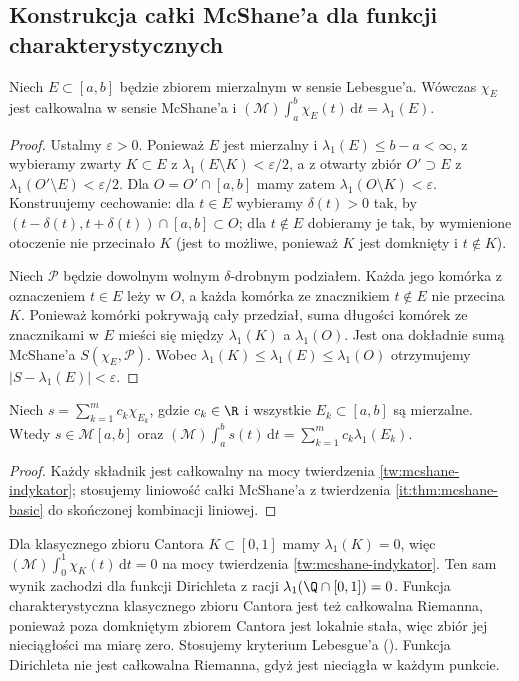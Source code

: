 \subsection*{Konstrukcja całki McShane'a dla funkcji charakterystycznych}
\begin{twierdzenie}\label{tw:mcshane-indykator}
Niech $E\subset[a,b]$ będzie zbiorem mierzalnym w sensie Lebesgue'a. Wówczas $\chi_E$ jest całkowalna w sensie McShane'a i
$(\mathcal M)\int_a^b\chi_E(t)\,\mathrm dt=\lambda_1(E)$.
\end{twierdzenie}
\begin{proof}
Ustalmy $\varepsilon>0$. Ponieważ $E$ jest mierzalny i $\lambda_1(E)\le b-a<\infty$, z
wybieramy zwarty $K\subset E$ z $\lambda_1(E\setminus K)<\varepsilon/2$,
a z 
otwarty zbiór $O'\supset E$ z $\lambda_1(O'\setminus E)<\varepsilon/2$.
Dla $O=O'\cap[a,b]$ mamy zatem $\lambda_1(O\setminus K)<\varepsilon$. Konstruujemy cechowanie: dla $t\in E$ wybieramy $\delta(t)>0$ tak, by $(t-\delta(t),t+\delta(t))\cap[a,b]\subset O$; dla $t\notin E$ dobieramy je tak, by wymienione otoczenie nie przecinało $K$ (jest to możliwe, ponieważ $K$ jest domknięty i $t\notin K$).

Niech $\mathcal P$ będzie dowolnym wolnym $\delta$-drobnym podziałem. Każda jego komórka z oznaczeniem $t\in E$ leży w $O$, a każda komórka ze znacznikiem $t\notin E$ nie przecina $K$. Ponieważ komórki pokrywają cały przedział, suma długości komórek ze znacznikami w $E$ mieści się między $\lambda_1(K)$ a $\lambda_1(O)$. Jest ona dokładnie sumą McShane'a $S(\chi_E,\mathcal P)$. Wobec $\lambda_1(K)\le\lambda_1(E)\le\lambda_1(O)$ otrzymujemy $|S-\lambda_1(E)|<\varepsilon$.
\end{proof}
\begin{wniosek}\label{wn:mcshane-proste}
Niech $s=\sum_{k=1}^m c_k\chi_{E_k}$, gdzie $c_k\in\R$ i wszystkie $E_k\subset[a,b]$ są mierzalne. Wtedy $s\in\mathcal M[a,b]$ oraz $(\mathcal M)\int_a^b s(t)\,\mathrm dt=\sum_{k=1}^m c_k\lambda_1(E_k)$.
\end{wniosek}
\begin{proof}
Każdy składnik jest całkowalny na mocy twierdzenia \ref{tw:mcshane-indykator}; stosujemy liniowość całki McShane'a z twierdzenia \ref{it:thm:mcshane-basic} do skończonej kombinacji liniowej.
\end{proof}
\begin{przyklad}
Dla klasycznego zbioru Cantora $K\subset[0,1]$ mamy $\lambda_1(K)=0$, więc $(\mathcal M)\int_0^1\chi_K(t)\,\mathrm dt=0$ na mocy twierdzenia \ref{tw:mcshane-indykator}. Ten sam wynik zachodzi dla funkcji Dirichleta z racji $\lambda_1(\Q\cap[0,1])=0$. Funkcja charakterystyczna klasycznego zbioru Cantora jest też całkowalna Riemanna, ponieważ poza domkniętym zbiorem Cantora jest lokalnie stała, więc zbiór jej nieciągłości ma miarę zero. Stosujemy kryterium Lebesgue'a (). Funkcja Dirichleta nie jest całkowalna Riemanna, gdyż jest nieciągła w każdym punkcie.
\end{przyklad}
